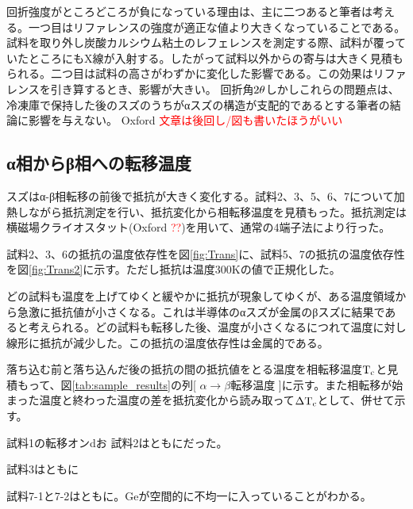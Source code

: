 回折強度がところどころが負になっている理由は、主に二つあると筆者は考える。一つ目はリファレンスの強度が適正な値より大きくなっていることである。試料を取り外し炭酸カルシウム粘土のレフェレンスを測定する際、試料が覆っていたところにもX線が入射する。したがって試料以外からの寄与は大きく見積もられる。二つ目は試料の高さがわずかに変化した影響である。この効果はリファレンスを引き算するとき、影響が大きい。
回折角$\rm 2\theta$しかしこれらの問題点は、冷凍庫で保持した後のスズのうちがαスズの構造が支配的であるとする筆者の結論に影響を与えない。
Oxford \textcolor{red}{文章は後回し/図も書いたほうがいい}


\subsection{α相からβ相への転移温度}
スズはα-β相転移の前後で抵抗が大きく変化する。試料2、3、5、6、7について加熱しながら抵抗測定を行い、抵抗変化から相転移温度を見積もった。抵抗測定は横磁場クライオスタット(Oxford \textcolor{red}{??})を用いて、通常の4端子法により行った。

試料2、3、6の抵抗の温度依存性を図\ref{fig:Trans}に、試料5、7の抵抗の温度依存性を図\ref{fig:Trans2}に示す。ただし抵抗は温度300Kの値で正規化した。

どの試料も温度を上げてゆくと緩やかに抵抗が現象してゆくが、ある温度領域から急激に抵抗値が小さくなる。これは半導体のαスズが金属のβスズに結果であると考えられる。どの試料も転移した後、温度が小さくなるにつれて温度に対し線形に抵抗が減少した。この抵抗の温度依存性は金属的である。

落ち込む前と落ち込んだ後の抵抗の間の抵抗値をとる温度を相転移温度$\rm T_c$と見積もって、図\ref{tab:sample_results}の列[ $\alpha\to\beta$転移温度 ]に示す。また相転移が始まった温度と終わった温度の差を抵抗変化から読み取って$\rm \Delta T_c$として、併せて示す。

試料1の転移オンdお
試料2はともにだった。

試料3はともに

試料7-1と7-2はともに。Geが空間的に不均一に入っていることがわかる。

